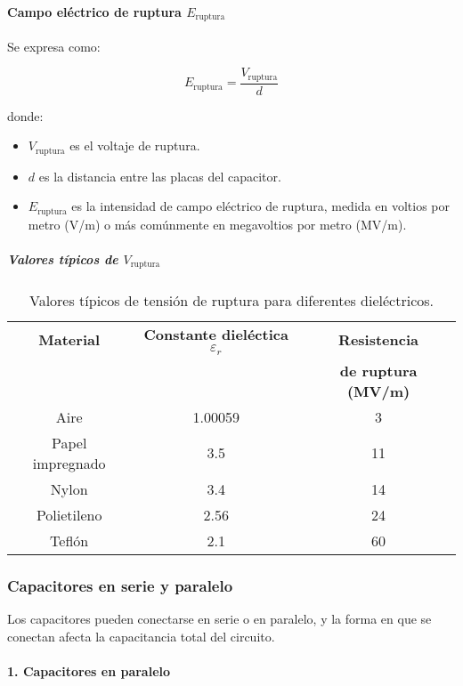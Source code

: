 \paragraph{Campo eléctrico de ruptura \( E_{\text{ruptura}} \)}

Se expresa como:

\[
E_{\text{ruptura}} = \frac{V_{\text{ruptura}}}{d}
\]

donde:

\begin{itemize}
    \item \( V_{\text{ruptura}} \) es el voltaje de ruptura.
    \item \( d \) es la distancia entre las placas del capacitor.
    \item \( E_{\text{ruptura}} \) es la intensidad de campo eléctrico de ruptura, medida en voltios por metro (V/m) o más comúnmente en megavoltios por metro (MV/m).
\end{itemize}

\subparagraph{Valores típicos de \( V_{\text{ruptura}} \)}

\begin{table*}
    \centering
    \begin{tabular}{|c|c|c|}
        \hline
        \textbf{Material} & \textbf{Constante dieléctica \(\varepsilon_r\)} & \textbf{Resistencia}\\ 
        &&\textbf{de ruptura (MV/m)} \\
        \hline
        Aire & 1.00059 & 3 \\
        Papel impregnado & 3.5 & 11 \\
        Nylon & 3.4 & 14 \\
        Polietileno & 2.56 & 24 \\
        Teflón & 2.1 & 60 \\
        \hline
    \end{tabular}
    \caption{Valores típicos de tensión de ruptura para diferentes dieléctricos.}
    \label{tab:ruptura}
\end{table*}

\subsubsection{Capacitores en serie y paralelo}

Los capacitores pueden conectarse en serie o en paralelo, y la forma en que se conectan afecta la capacitancia total del circuito.

\paragraph{1. Capacitores en paralelo}

